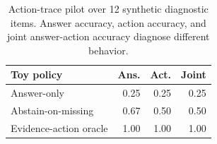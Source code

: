 \begin{table}[t]
\centering
\small
\begin{tabular}{lrrr}
\toprule
\textbf{Toy policy} & \textbf{Ans.} & \textbf{Act.} & \textbf{Joint} \\
\midrule
Answer-only & 0.25 & 0.25 & 0.25 \\
Abstain-on-missing & 0.67 & 0.50 & 0.50 \\
Evidence-action oracle & 1.00 & 1.00 & 1.00 \\
\bottomrule
\end{tabular}
\caption{Action-trace pilot over 12 synthetic diagnostic items. Answer accuracy, action accuracy, and joint answer-action accuracy diagnose different behavior.}
\label{tab:action-trace-pilot-results}
\end{table}

